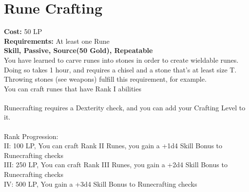 \section{Rune Crafting}\label{perk:runecrafting}
\textbf{Cost:} 50 LP\\
\textbf{Requirements:} At least one Rune\\
\textbf{Skill, Passive, Source(50 Gold), Repeatable}\\
You have learned to carve runes into stones in order to create wieldable runes.\\
Doing so takes 1 hour, and requires a chisel and a stone that's at least size T.
Throwing stones (see weapons) fulfill this requirement, for example.\\
You can craft runes that have Rank I abilities\\
\\
Runecrafting requires a Dexterity check, and you can add your Crafting Level to it.\\
\\
Rank Progression:\\
II: 100 LP, You can craft Rank II Runes, you gain a +1d4 Skill Bonus to Runecrafting checks\\
III: 250 LP, You can craft Rank III Runes, you gain a +2d4 Skill Bonus to Runecrafting checks\\
IV: 500 LP, You gain a +3d4 Skill Bonus to Runecrafting checks\\